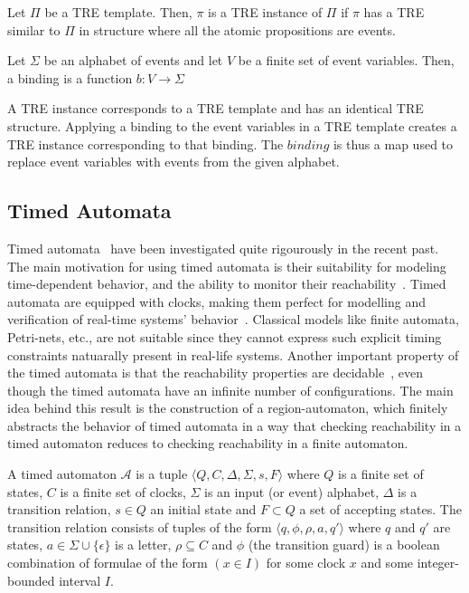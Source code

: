 \documentclass[]{sigplanconf}
\begin{document}
\begin{defns}
Let $\Pi$ be a TRE template. Then, $\pi$ is a TRE instance of $\Pi$ if $\pi$ has a TRE similar to $\Pi$ in structure where all the atomic propositions are events.
\end{defns}

\begin{defns}[Binding]
Let $\Sigma$ be an alphabet of events and let $V$ be a finite set of event variables. Then, a binding is a function $b \colon V \rightarrow \Sigma$
\end{defns}

A TRE instance corresponds to a TRE template and has an identical TRE structure. Applying a binding to the event variables in a TRE template creates a TRE instance corresponding to that binding. The $binding$ is thus a map used to replace event variables with events from the given alphabet.

\subsection{Timed Automata}

Timed automata~\cite{Alur:1994:TTA:180782.180519} have been investigated quite rigourously in the recent past. The main motivation for using timed automata is their suitability for modeling time-dependent behavior, and the ability to monitor their reachability~\cite{LPY97}. Timed automata are equipped with clocks, making them perfect for modelling and verification of real-time systems' behavior~\cite{Alur:1994:TTA:180782.180519}. Classical models like finite automata, Petri-nets, etc., are not suitable since they cannot express such explicit timing constraints natuarally present in real-life systems. Another important property of the timed automata is that the reachability properties are decidable~\cite{Alur:1994:TTA:180782.180519}, even though the timed automata have an infinite number of configurations. The main idea behind this result is the construction of a region-automaton, which finitely abstracts the behavior of timed automata in a way that checking reachability in a timed automaton reduces to checking reachability in a finite automaton.

\begin{defns}
A timed automaton  $\mathcal{A}$ is a tuple $\langle Q,C,\Delta ,\Sigma, s,F\rangle$ where $Q$ is a finite set of states, $C$ is a finite set of clocks, $\Sigma$ is an input (or event) alphabet, $\Delta$ is a transition relation, $s \in Q$ an initial state and $F \subset Q$ a set of accepting states. The transition relation consists of tuples of the form $\langle q ,\phi ,\rho, a, q' \rangle$ where $q$ and $q'$  are states, $a \in \Sigma \cup \{\epsilon \}$ is a letter, $\rho \subseteq C$ and $\phi$ (the transition guard) is a boolean combination of formulae of the form $(x \in I)$ for some clock $x$ and some integer-bounded interval $I$.
\end{defns}
\end{document}
